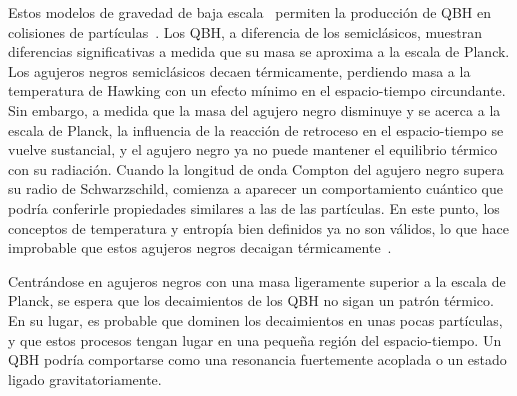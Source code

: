 Estos modelos de gravedad de baja escala~\cite{Antoniadis_Arkani_Dimopoulos_Dvali-1998,ADD-1998,RS1-1999_1,RS1-1999_2,Dvali-2008,Dvali-2010} permiten la producción de \ac{QBH} en colisiones de partículas~\cite{Argyres-1998,Banks-1999,Giddings-2002}.
Los \ac{QBH}, a diferencia de los semiclásicos, muestran diferencias significativas a medida que su masa se aproxima a la escala de Planck. Los agujeros negros semiclásicos decaen térmicamente, perdiendo masa a la temperatura de Hawking con un efecto mínimo en el espacio-tiempo circundante. Sin embargo, a medida que la masa del agujero negro disminuye y se acerca a la escala de Planck, la influencia de la reacción de retroceso en el espacio-tiempo se vuelve sustancial, y el agujero negro ya no puede mantener el equilibrio térmico con su radiación. Cuando la longitud de onda Compton del agujero negro supera su radio de Schwarzschild, comienza a aparecer un comportamiento cuántico que podría conferirle propiedades similares a las de las partículas. En este punto, los conceptos de temperatura y entropía bien definidos ya no son v\'alidos, lo que hace improbable que estos agujeros negros decaigan térmicamente~\cite{Meade-2008,Alberghi-2006,Alberghi-2007}.

Centr\'andose en agujeros negros con una masa ligeramente superior a la escala de Planck, se espera que los decaimientos de los \ac{QBH} no sigan un patrón térmico. En su lugar, es probable que dominen los decaimientos en unas pocas partículas, y que estos procesos tengan lugar en una pequeña región del espacio-tiempo. Un \ac{QBH} podría comportarse como una resonancia fuertemente acoplada o un estado ligado gravitatoriamente.

